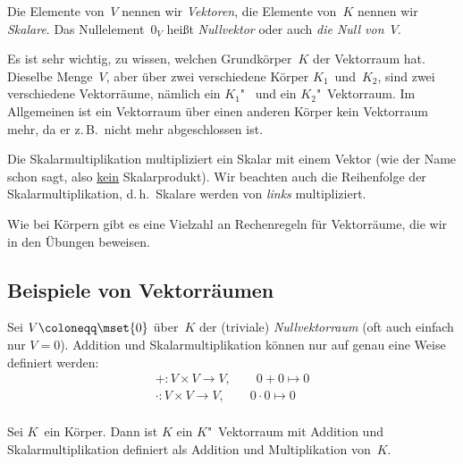 \documentclass[a4paper]{article}
\begin{document}
\begin{notation}
    Die Elemente von~$V$ nennen wir \emph{Vektoren}, die Elemente von~$K$ nennen wir \emph{Skalare}. Das Nullelement~$0_V$ heißt \emph{Nullvektor} oder auch \emph{die Null von~$V$}.
\end{notation}

\begin{remark}
    Es ist sehr wichtig, zu wissen, welchen Grundkörper~$K$ der Vektorraum hat. Dieselbe Menge~$V$, aber über zwei verschiedene Körper $K_1$~und~$K_2$, sind zwei verschiedene Vektorräume, nämlich ein $K_1$"~ und ein $K_2$"~Vektorraum. Im Allgemeinen ist ein Vektorraum über einen anderen Körper kein Vektorraum mehr, da er z.\,B.\ nicht mehr abgeschlossen ist.
\end{remark}

\begin{remark}
    Die Skalarmultiplikation multipliziert ein Skalar mit einem Vektor (wie der Name schon sagt, also \underline{kein} Skalarprodukt). Wir beachten auch die Reihenfolge der Skalarmultiplikation, d.\,h.\ Skalare werden von \emph{links} multipliziert.
\end{remark}

Wie bei Körpern gibt es eine Vielzahl an Rechenregeln für Vektorräume, die wir in den Übungen beweisen.

\subsection{Beispiele von Vektorräumen}

\begin{notation}[Nullvektorraum]
    Sei $V \coloneqq \mset{0}$ über~$K$ der (triviale) \emph{Nullvektorraum} (oft auch einfach nur $V = 0$). Addition und Skalarmultiplikation können nur auf genau eine Weise definiert werden:
    \begin{gather*}
        +\colon V\times V \to V,\qquad 0+0 \mapsto 0 \\
        \cdot\colon V\times V \to V,\qquad 0\cdot0 \mapsto 0 \\
    \end{gather*}
\end{notation}

\begin{example}
    Sei $K$~ein Körper. Dann ist $K$ ein $K$"~Vektorraum mit Addition und Skalarmultiplikation definiert als Addition und Multiplikation von~$K$.
\end{example}
\end{document}
